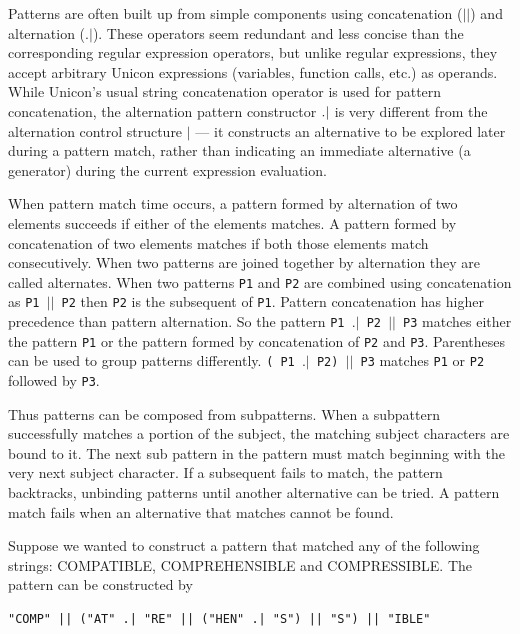 \documentclass[letterpaper,12pt]{article}
\begin{document}
Patterns are often built up from simple components using concatenation
($||$) and alternation ($.|$). These operators seem redundant and less
concise than the corresponding regular expression operators, but
unlike regular expressions, they accept arbitrary Unicon expressions
(variables, function calls, etc.) as operands.  While Unicon's
usual string concatenation operator is used for pattern concatenation,
the alternation pattern constructor
${\tt .|}$ is very different from the alternation control structure $|$ ---
it constructs an alternative to be explored later during a
pattern match, rather than indicating an immediate alternative (a
generator) during the current expression evaluation.

When pattern match time occurs, a pattern formed
by alternation of two elements succeeds if either of the elements
matches. A pattern formed by concatenation of two elements matches if
both those elements match consecutively. When two patterns are joined
together by alternation they are called alternates. When two patterns
{\tt P1} and {\tt P2} are combined using concatenation as {\tt P1 $||$ P2}
then {\tt P2} is the subsequent of {\tt P1}. Pattern concatenation has
higher precedence than pattern alternation. So the pattern
{\tt P1 $.|$ P2 $||$ P3} matches either the pattern {\tt P1} or the
pattern formed by concatenation of {\tt P2} and
{\tt P3}. Parentheses can be used to group patterns differently.
{\tt ( P1 $.|$ P2) $||$ P3} matches {\tt P1} or {\tt P2} followed by
{\tt P3}.

Thus patterns can be composed from subpatterns. When a subpattern
successfully matches a portion of the subject, the matching subject
characters are bound to it. The next sub pattern in the pattern must
match beginning with the very next subject character. If a subsequent
fails to match, the pattern backtracks, unbinding patterns until
another alternative can be tried. A pattern match fails when an
alternative that matches cannot be found.

Suppose we wanted to construct a pattern that matched any of the
following strings: COMPATIBLE, COMPREHENSIBLE and
COMPRESSIBLE. The pattern can be constructed by

\begin{verbatim}
"COMP" || ("AT" .| "RE" || ("HEN" .| "S") || "S") || "IBLE"
\end{verbatim}
\end{document}
